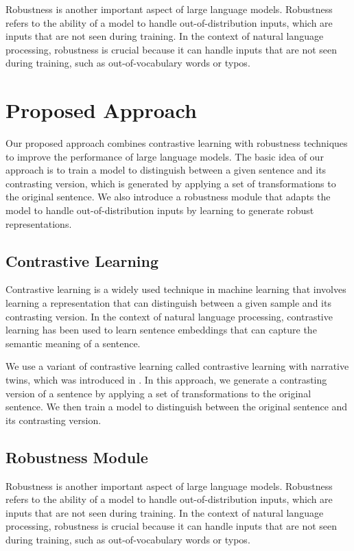 \documentclass{article}
\begin{document}
Robustness is another important aspect of large language models. Robustness refers to the ability of a model to handle out-of-distribution inputs, which are inputs that are not seen during training. In the context of natural language processing, robustness is crucial because it can handle inputs that are not seen during training, such as out-of-vocabulary words or typos.

\section{Proposed Approach}

Our proposed approach combines contrastive learning with robustness techniques to improve the performance of large language models. The basic idea of our approach is to train a model to distinguish between a given sentence and its contrasting version, which is generated by applying a set of transformations to the original sentence. We also introduce a robustness module that adapts the model to handle out-of-distribution inputs by learning to generate robust representations.

\subsection{Contrastive Learning}

Contrastive learning is a widely used technique in machine learning that involves learning a representation that can distinguish between a given sample and its contrasting version. In the context of natural language processing, contrastive learning has been used to learn sentence embeddings that can capture the semantic meaning of a sentence.

We use a variant of contrastive learning called contrastive learning with narrative twins, which was introduced in \cite{sterner2026contrastivelearningnarrativetwins}. In this approach, we generate a contrasting version of a sentence by applying a set of transformations to the original sentence. We then train a model to distinguish between the original sentence and its contrasting version.

\subsection{Robustness Module}

Robustness is another important aspect of large language models. Robustness refers to the ability of a model to handle out-of-distribution inputs, which are inputs that are not seen during training. In the context of natural language processing, robustness is crucial because it can handle inputs that are not seen during training, such as out-of-vocabulary words or typos.
\end{document}
